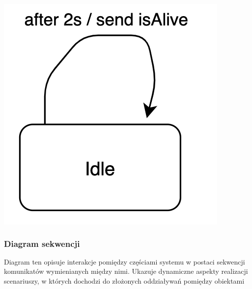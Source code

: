 \documentclass[12pt]{article}
\begin{document}
\begin{itemize}
\begin{itemize}
                        \begin{center}
                            \includegraphics[scale=0.50]{state-diagram/signal.png}
                        \end{center}

                        \end{itemize}
                \end{itemize}

            \subsubsection{Diagram sekwencji}

                Diagram ten opisuje interakcje pomiędzy częściami systemu w postaci sekwencji 
                komunikatów wymienianych między nimi. Ukazuje dynamiczne aspekty realizacji 
                scenariuszy, w których dochodzi do złożonych oddziaływań pomiędzy obiektami 
\end{document}
